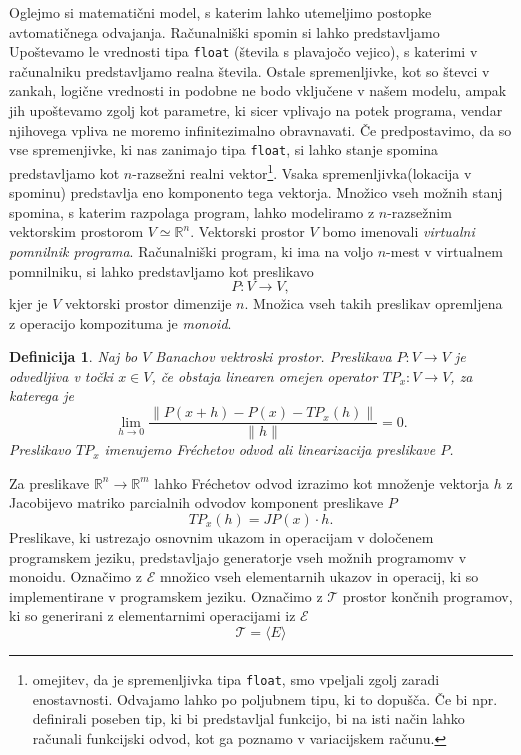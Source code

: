 \documentclass{article}
\newcommand{\RR}{\mathbb{R}}
\newcommand{\E}{\mathcal{E}}
\newcommand{\T}{\mathcal{T}}
\newtheorem{definicija}{Definicija}[section]
\begin{document}
Oglejmo si matematični model, s katerim lahko utemeljimo postopke avtomatičnega
odvajanja. Računalniški spomin si lahko predstavljamo Upoštevamo le vrednosti
tipa \texttt{float} (števila s plavajočo vejico), s katerimi v računalniku
predstavljamo realna števila. Ostale spremenljivke, kot so števci v zankah, logične
vrednosti in podobne ne bodo vključene v našem modelu, ampak jih upoštevamo
zgolj kot parametre, ki sicer vplivajo na potek programa, vendar njihovega
vpliva ne moremo infinitezimalno obravnavati. Če predpostavimo, da so vse
spremenjivke, ki nas zanimajo tipa \texttt{float}, si lahko stanje spomina
predstavljamo kot $n$-razsežni realni vektor\footnote[1]{omejitev, da je
  spremenljivka tipa \texttt{float}, smo vpeljali zgolj zaradi enostavnosti.
  Odvajamo lahko po poljubnem tipu, ki to dopušča. Če bi npr. definirali
  poseben tip, ki bi predstavljal funkcijo, bi na isti način lahko računali
  funkcijski odvod, kot ga poznamo v variacijskem računu.}. Vsaka spremenljivka(lokacija v
spominu) predstavlja eno komponento tega vektorja. Množico vseh možnih stanj
spomina, s katerim razpolaga program, lahko modeliramo z $n$-razsežnim
vektorskim prostorom $V\simeq\RR^n$. Vektorski prostor $V$ bomo imenovali
\emph{virtualni pomnilnik programa}. Računalniški program, ki
ima na voljo $n$-mest v virtualnem pomnilniku, si lahko predstavljamo kot preslikavo
\begin{equation}
  \label{eq:program_kot_preslikava}
  P: V\to V,
\end{equation}
kjer je $V$ vektorski prostor dimenzije $n$. Množica vseh takih preslikav
opremljena z operacijo kompozituma je \emph{monoid}.
\begin{definicija}
  Naj bo $V$ Banachov vektroski prostor. Preslikava $P:V\to V$ je odvedljiva v
  točki $x\in V$, če obstaja
  linearen omejen operator $TP_x:V\to V$, za katerega je
  \begin{equation}
    \label{eq:frechet}
    \lim_{h\to 0}\frac{\|P(x+h)-P(x)-TP_x(h)\|}{\|h\|} = 0.
  \end{equation}
  Preslikavo $TP_x$ imenujemo \emph{Fréchetov odvod} ali \emph{linearizacija}
  preslikave $P$.
\end{definicija}
Za preslikave $\RR^n\to \RR^m$ lahko Fréchetov odvod
izrazimo kot množenje vektorja $h$ z Jacobijevo matriko parcialnih odvodov
komponent preslikave $P$
\begin{equation*}
  TP_x(h) = JP(x)\cdot h.
\end{equation*}
Preslikave, ki ustrezajo osnovnim ukazom in operacijam v določenem
programskem jeziku, predstavljajo generatorje vseh možnih programomv v
monoidu. Označimo z $\E$ množico vseh elementarnih ukazov in operacij, ki so
implementirane v programskem jeziku. Označimo z $\T$ prostor končnih programov,
ki so generirani z elementarnimi operacijami iz $\E$
\begin{equation*}
  \T=\langle E \rangle
\end{equation*}
\end{document}
